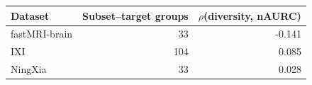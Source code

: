 \begin{tabular}{lrr}
\toprule
Dataset & Subset--target groups & $\rho$(diversity, nAURC) \\
\midrule
fastMRI-brain & 33 & -0.141 \\
IXI & 104 & 0.085 \\
NingXia & 33 & 0.028 \\
\bottomrule
\end{tabular}
